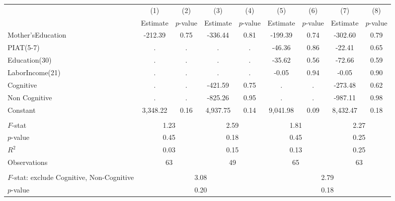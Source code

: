 \begin{tabular}{lcccccccc} \toprule
 & (1) & (2) & (3) & (4) & (5) & (6) & (7) & (8) \\
 & Estimate & $p$-value & Estimate & $p$-value  & Estimate & $p$-value  & Estimate & $p$-value  \\ \midrule 
Mother'sEducation &      -212.39 &         0.75 &      -336.44 &         0.81 &      -199.39 &         0.74 &      -302.60 &         0.79 \\  
PIAT(5-7) &            . &            . &            . &            . &       -46.36 &         0.86 &       -22.41 &         0.65 \\  
Education(30) &            . &            . &            . &            . &       -35.62 &         0.56 &       -72.66 &         0.59 \\  
LaborIncome(21) &            . &            . &            . &            . &        -0.05 &         0.94 &        -0.05 &         0.90 \\  
Cognitive &            . &            . &      -421.59 &         0.75 &            . &            . &      -273.48 &         0.62 \\  
Non Cognitive &            . &            . &      -825.26 &         0.95 &            . &            . &      -987.11 &         0.98 \\  
Constant &     3,348.22 &         0.16 &     4,937.75 &         0.14 &     9,041.98 &         0.09 &     8,432.47 &         0.18 \\  \\ \midrule
$F$-stat  &          \multicolumn{2}{c}{1.23} &            \multicolumn{2}{c}{2.59} &                  \multicolumn{2}{c}{1.81} &               \multicolumn{2}{c}{2.27}  \\  
$p$-value  &          \multicolumn{2}{c}{0.45} &            \multicolumn{2}{c}{0.18} &                  \multicolumn{2}{c}{0.45} &               \multicolumn{2}{c}{0.25}  \\  
$R^2$  &          \multicolumn{2}{c}{0.03} &            \multicolumn{2}{c}{0.15} &                  \multicolumn{2}{c}{0.13} &               \multicolumn{2}{c}{0.25}  \\  
Observations &        \multicolumn{2}{c}{63} &               \multicolumn{2}{c}{49}  &             \multicolumn{2}{c}{65}  &         \multicolumn{2}{c}{63}  \\   \\ \midrule
$F$-stat: exclude Cognitive, Non-Cognitive &                    \multicolumn{4}{c}{3.08} &                   \multicolumn{4}{c}{2.79}  \\  
$p$-value &              \multicolumn{4}{c}{0.20} &                    \multicolumn{4}{c}{0.18}  \\      \bottomrule \end{tabular}